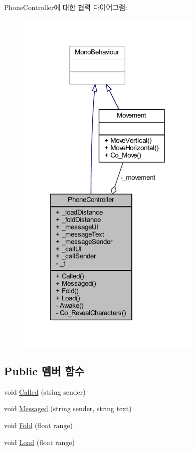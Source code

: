 Phone\+Controller에 대한 협력 다이어그램\+:\nopagebreak
\begin{figure}[H]
\begin{center}
\leavevmode
\includegraphics[width=251pt]{d2/dea/class_phone_controller__coll__graph}
\end{center}
\end{figure}
\subsection*{Public 멤버 함수}
\begin{DoxyCompactItemize}
\item 
void \mbox{\hyperlink{class_phone_controller_ac71638a18a3f825bc2acc6d06a0b6d96}{Called}} (string sender)
\item 
void \mbox{\hyperlink{class_phone_controller_ac7b30cfeb29ad0f4a1b5602105c10a73}{Messaged}} (string sender, string text)
\item 
void \mbox{\hyperlink{class_phone_controller_a4ed186c0bf78d2a95be61cef1dae7553}{Fold}} (float range)
\item 
void \mbox{\hyperlink{class_phone_controller_ad37fb645609c73334c2992d0bb8909c2}{Load}} (float range)
\end{DoxyCompactItemize}
